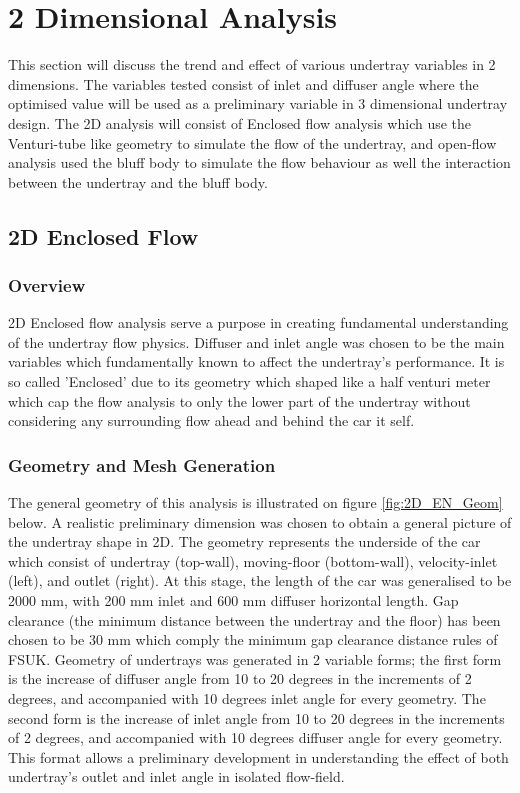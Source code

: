 
\section{2 Dimensional Analysis}
This section will discuss the trend and effect of various undertray variables in 2 dimensions. The variables tested consist of inlet and diffuser angle where the optimised value will be used as a preliminary variable in 3 dimensional undertray design. The 2D analysis will consist of Enclosed flow analysis which use the Venturi-tube like geometry to simulate the flow of the undertray, and open-flow analysis used the bluff body to simulate the flow behaviour as well the interaction between the undertray and the bluff body. 

\subsection{2D Enclosed Flow}
\subsubsection{Overview}
2D Enclosed flow analysis serve a purpose in creating fundamental understanding of the undertray flow physics. Diffuser and inlet angle was chosen to be the main variables which fundamentally known to affect the undertray's performance. It is so called 'Enclosed' due to its geometry which shaped like a half venturi meter which cap the flow analysis to only the lower part of the undertray without considering any surrounding flow ahead and behind the car it self.  %

\subsubsection{Geometry and Mesh Generation}
\noindent The general geometry of this analysis is illustrated on figure \ref{fig:2D_EN_Geom} below. A realistic preliminary dimension was chosen to obtain a general picture of the undertray shape in 2D. The geometry represents the underside of the car which consist of undertray (top-wall), moving-floor (bottom-wall), velocity-inlet (left), and outlet (right). At this stage, the length of the car was generalised to be 2000 mm, with 200 mm inlet and 600 mm diffuser horizontal length. Gap clearance (the minimum distance between the undertray and the floor) has been chosen to be 30 mm which comply the minimum gap clearance distance rules of FSUK. Geometry of undertrays was generated in 2 variable forms; the first form is the increase of diffuser angle from 10 to 20 degrees in the increments of 2 degrees, and accompanied with 10 degrees inlet angle for every geometry. The second form is the increase of inlet angle from 10 to 20 degrees in the increments of 2 degrees, and accompanied with 10 degrees diffuser angle for every geometry. This format allows a preliminary development in understanding the effect of both undertray's outlet and inlet angle in isolated flow-field. 

